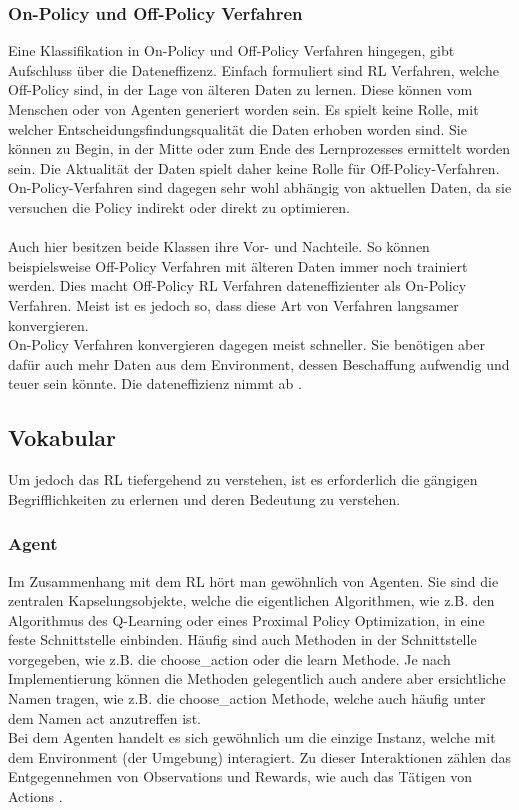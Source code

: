 \subsubsection{On-Policy und Off-Policy Verfahren}
Eine Klassifikation in On-Policy und Off-Policy Verfahren hingegen, gibt Aufschluss über die Dateneffizenz. Einfach formuliert sind RL Verfahren, welche Off-Policy sind, in der Lage von älteren Daten zu lernen. Diese können vom Menschen oder von Agenten generiert worden sein. Es spielt keine Rolle, mit welcher Entscheidungsfindungsqualität die Daten erhoben worden sind. Sie können zu Begin, in der Mitte oder zum Ende des Lernprozesses ermittelt worden sein. Die Aktualität der Daten spielt daher keine Rolle für Off-Policy-Verfahren.\\
On-Policy-Verfahren sind dagegen sehr wohl abhängig von aktuellen Daten, da sie versuchen die Policy indirekt oder direkt zu optimieren.\\
\\Auch hier besitzen beide Klassen ihre Vor- und Nachteile. So können beispielsweise Off-Policy Verfahren mit älteren Daten immer noch trainiert werden. Dies macht Off-Policy RL Verfahren dateneffizienter als On-Policy Verfahren. Meist ist es jedoch so, dass diese Art von Verfahren langsamer konvergieren.\\
On-Policy Verfahren konvergieren dagegen meist schneller. Sie benötigen aber dafür auch mehr Daten aus dem Environment, dessen Beschaffung aufwendig und teuer sein könnte. Die dateneffizienz nimmt ab \cite{DRL}.

\subsection{Vokabular}
Um jedoch das RL tiefergehend zu verstehen, ist es erforderlich die gängigen Begrifflichkeiten zu erlernen und deren Bedeutung zu verstehen.

\subsubsection{Agent}\label{sec:Agent}
Im Zusammenhang mit dem RL hört man gewöhnlich von Agenten. Sie sind die zentralen Kapselungsobjekte, welche die eigentlichen Algorithmen, wie z.B. den Algorithmus des Q-Learning oder eines Proximal Policy Optimization, in eine feste Schnittstelle einbinden. Häufig sind auch Methoden in der Schnittstelle vorgegeben, wie z.B. die choose\_action oder die learn Methode. Je nach Implementierung können die Methoden gelegentlich auch andere aber ersichtliche Namen tragen, wie z.B. die choose\_action Methode, welche auch häufig unter dem Namen \glqq act\grqq{} anzutreffen ist.\\
Bei dem Agenten handelt es sich gewöhnlich um die einzige Instanz, welche mit dem Environment (der Umgebung) interagiert. Zu dieser Interaktionen zählen das Entgegennehmen von Observations und Rewards, wie auch das Tätigen von Actions \cite{DRL}.

